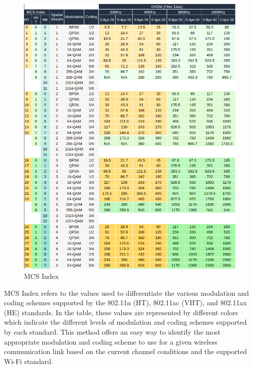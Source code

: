 \begin{figure}[hbt!]  
    \centering
    \includegraphics[width=\textwidth]{figures/MCS-Index.png}
    \caption{MCS Index}
    \label{fig:plot_MCS_Index}
\end{figure}
\FloatBarrier
\vspace{1cm}
MCS Index refers to the values used to differentiate the various modulation and coding schemes supported by the 802.11n (HT), 802.11ac (VHT), and 802.11ax (HE) standards. In the table, these values are represented by different colors which indicate the different levels of modulation and coding schemes supported by each standard. This method offers an easy way to identify the most appropriate modulation and coding scheme to use for a given wireless communication link based on the current channel conditions and the supported Wi-Fi standard.

